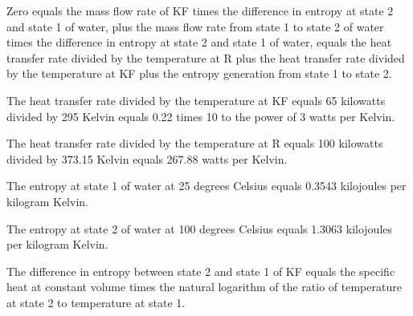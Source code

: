 Zero equals the mass flow rate of KF times the difference in entropy at state 2 and state 1 of water, plus the mass flow rate from state 1 to state 2 of water times the difference in entropy at state 2 and state 1 of water, equals the heat transfer rate divided by the temperature at R plus the heat transfer rate divided by the temperature at KF plus the entropy generation from state 1 to state 2.

The heat transfer rate divided by the temperature at KF equals 65 kilowatts divided by 295 Kelvin equals 0.22 times 10 to the power of 3 watts per Kelvin.

The heat transfer rate divided by the temperature at R equals 100 kilowatts divided by 373.15 Kelvin equals 267.88 watts per Kelvin.

The entropy at state 1 of water at 25 degrees Celsius equals 0.3543 kilojoules per kilogram Kelvin.

The entropy at state 2 of water at 100 degrees Celsius equals 1.3063 kilojoules per kilogram Kelvin.

The difference in entropy between state 2 and state 1 of KF equals the specific heat at constant volume times the natural logarithm of the ratio of temperature at state 2 to temperature at state 1.